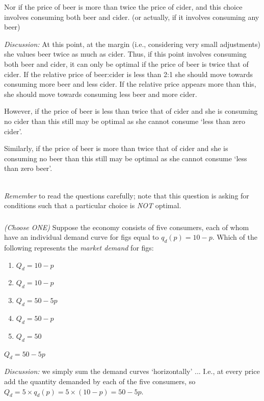 \documentclass[]{article}
\begin{document}
Nor if the price of beer is more than twice the price of cider, and this
choice involves consuming both beer and cider. (or actually, if it
involves consuming any beer)

\emph{Discussion:} At this point, at the margin (i.e., considering very
small adjustments) she values beer twice as much as cider. Thus, if this
point involves consuming both beer and cider, it can only be optimal if
the price of beer is twice that of cider. If the relative price of
beer:cider is less than 2:1 she should move towards consuming more beer
and less cider. If the relative price appears more than this, she should
move towards consuming less beer and more cider.

However, if the price of beer is less than twice that of cider and she
is consuming no cider than this still may be optimal as she cannot
consume `less than zero cider'.

Similarly, if the price of beer is more than twice that of cider and she
is consuming no beer than this still may be optimal as she cannot
consume `less than zero beer'.

~\\

\emph{Remember} to read the questions carefully; note that this question
is asking for conditions such that a particular choice is \emph{NOT}
optimal.

\hypertarget{section-10}{%
\subsubsection{}\label{section-10}}

\emph{(Choose ONE)} Suppose the economy consists of five consumers, each
of whom have an individual demand curve for figs equal to
\(q_d(p) = 10-p\). Which of the following represents the \emph{market
demand} for figs:

\begin{enumerate}
\def\labelenumi{\Alph{enumi}.}
\item
  \(Q_d = 10-p\)
\item
  \(Q_d = 10-p\)
\item
  \(Q_d = 50-5p\)
\item
  \(Q_d = 50-p\)
\item
  \(Q_d = 50\)
\end{enumerate}

\(Q_d = 50-5p\)

\emph{Discussion:} we simply sum the demand curves `horizontally' ...
I.e., at every price add the quantity demanded by each of the five
consumers, so \(Q_d = 5 \times q_d(p) = 5 \times(10-p) = 50-5p.\)
\end{document}
